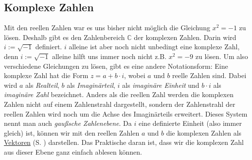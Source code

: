 \documentclass[12pt]{article}
\newcommand{\highlight}[2]{\textcolor{blue}{\hyperref[#1]{#2}} (S. \pageref{#1})}
\begin{document}
	\subsection{Komplexe Zahlen}
		Mit den reellen Zahlen war es uns bisher nicht möglich die Gleichung $x^2=-1$ zu lösen. Deshalb gibt es den Zahlenbereich $\mathbb{C}$ der komplexen Zahlen. Darin wird $i:=\sqrt{-1}$ definiert. $i$ alleine ist aber noch nicht unbedingt eine komplexe Zahl, denn $i:=\sqrt{-1}$ alleine hilft uns immer noch nicht z.B. $x^2=-9$ zu lösen. Um also verschiedene Gleichungen zu lösen, gibt es eine andere Notationsform: Eine komplexe Zahl hat die Form $z=a+b\cdot i$, wobei $a$ und $b$ reelle Zahlen sind. Dabei wird $a$ als \textit{Realteil}, $b$ als \textit{Imaginärteil}, $i$ als \textit{imaginäre Einheit} und $b\cdot i$ als \textit{imaginäre Zahl} bezeichnet. Anders als die reellen Zahl werden die komplexen Zahlen nicht auf einem Zahlenstrahl dargestellt, sondern der Zahlenstrahl der reellen Zahlen wird noch um die Achse des Imaginärteils erweitert. Dieses System nennt man auch \textit{gaußsche Zahlenebene}. Da $i$ eine definierte Einheit (also immer gleich) ist, können wir mit den reellen Zahlen $a$ und $b$ die komplexen Zahlen als \highlight{sec:vektorgeometrie}{Vektoren} darstellen. Das Praktische daran ist, dass wir die komplexen Zahl aus dieser Ebene ganz einfach ablesen können.
		\begin{center}
		\end{center}
\end{document}
